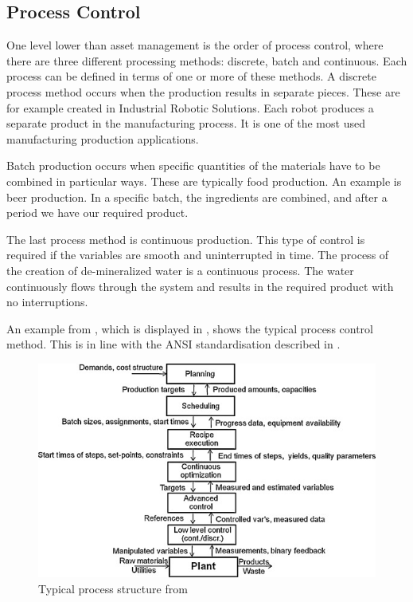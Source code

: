 	
\subsection{Process Control}
One level lower than asset management is the order of process control, where there are three different processing methods: discrete, batch and continuous. Each process can be defined in terms of one or more of these methods. A discrete process method occurs when the production results in separate pieces. These are for example created in Industrial Robotic Solutions. Each robot produces a separate product in the manufacturing process. It is one of the most used manufacturing production applications. 

Batch production occurs when specific quantities of the materials have to be combined in particular ways. These are typically food production. An example is beer production. In a specific batch, the ingredients are combined, and after a period we have our required product.

The last process method is continuous production. This type of control is required if the variables are smooth and uninterrupted in time. The process of the creation of de-mineralized water is a continuous process. The water continuously flows through the system and results in the required product with no interruptions.

An example from \citet{engell2012optimal}, which is displayed in , shows the typical process control method. This is in line with the ANSI standardisation described in .

\begin{figure}[h]
\centering
\includegraphics[width=0.7\linewidth]{img/process_structure}
\caption{Typical process structure from \citep{engell2012optimal}}
\label{fig:processstructure}
\end{figure}

